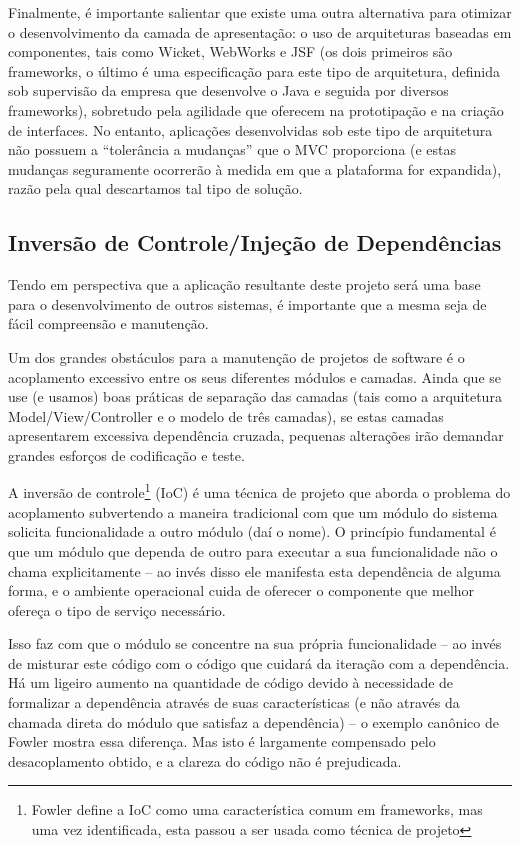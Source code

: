 \documentclass{abnt}
\begin{document}
Finalmente, é importante salientar que existe uma outra alternativa para otimizar o desenvolvimento da camada de apresentação: o uso de arquiteturas baseadas em componentes, tais como Wicket, WebWorks e JSF (os dois primeiros são frameworks, o último é uma especificação para este tipo de arquitetura, definida sob supervisão da empresa que desenvolve o Java e seguida por diversos frameworks), sobretudo pela agilidade que oferecem na prototipação e na criação de interfaces. No entanto, aplicações desenvolvidas sob este tipo de arquitetura não possuem a “tolerância a mudanças” que o MVC proporciona (e estas mudanças seguramente ocorrerão à medida em que a plataforma for expandida), razão pela qual descartamos tal tipo de solução.

	\subsection{Inversão de Controle/Injeção de Dependências}

Tendo em perspectiva que a aplicação resultante deste projeto será uma base para o desenvolvimento de outros sistemas, é importante que a mesma seja de fácil compreensão e manutenção.

	Um dos grandes obstáculos para a manutenção de projetos de software é o acoplamento excessivo entre os seus diferentes módulos e camadas. Ainda que se use (e usamos) boas práticas de separação das camadas (tais como a arquitetura Model/View/Controller e o modelo de três camadas), se estas camadas apresentarem excessiva dependência cruzada, pequenas alterações irão demandar grandes esforços de codificação e teste.

A inversão de controle\footnote{Fowler\cite{FowlerIoc} define a IoC como uma característica comum em frameworks, mas uma vez identificada, esta passou a ser usada como técnica de projeto } (IoC) é uma técnica de projeto que aborda o problema do acoplamento subvertendo a maneira tradicional com que um módulo do sistema solicita funcionalidade a outro módulo (daí o nome). O princípio fundamental é que um módulo que dependa de outro para executar a sua funcionalidade não o chama explicitamente – ao invés disso ele manifesta esta dependência de alguma forma, e o ambiente operacional cuida de oferecer o componente que melhor ofereça o tipo de serviço necessário.

Isso faz com que o módulo se concentre na sua própria funcionalidade – ao invés de misturar este código com o código que cuidará da iteração com a dependência. Há um ligeiro aumento na quantidade de código devido à necessidade de formalizar a dependência através de suas características (e não através da chamada direta do módulo que satisfaz a dependência) – o exemplo canônico de Fowler mostra essa diferença. Mas isto é largamente compensado pelo desacoplamento obtido, e a clareza do código não é prejudicada.
\end{document}
